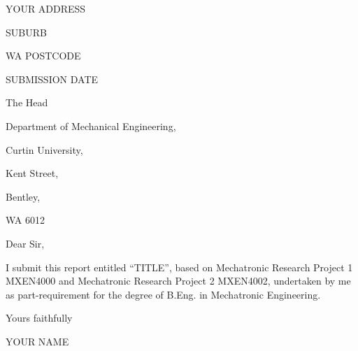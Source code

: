 {\setlength{\parskip}{0em}
\begin{flushright}
	YOUR ADDRESS
	
	SUBURB
	
	WA POSTCODE
	
	\vspace{12pt}
	SUBMISSION DATE
\end{flushright}
\vspace{12pt}
\begin{flushleft}
	The Head
	
	Department of Mechanical Engineering,
	
	Curtin University,
	
	Kent Street,
	
	Bentley,
	
	WA 6012
	
	\vspace{12pt}
	\vspace{12pt}
	
	Dear Sir,
	
	\vspace{12pt}
	
	I submit this report entitled “TITLE”, based on Mechatronic Research Project 1 MXEN4000 and Mechatronic Research Project 2 MXEN4002, undertaken by me as part-requirement for the degree of B.Eng. in Mechatronic Engineering.
	
	\vspace{12pt}
	
	Yours faithfully
	
	\vspace{12pt}
	\vspace{12pt}
	\vspace{12pt}
	\vspace{12pt}
	
	YOUR NAME
\end{flushleft}}